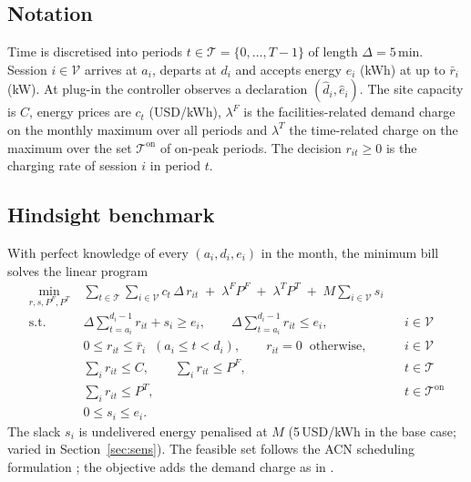 \subsection{Notation}
Time is discretised into periods $t\in\mathcal T=\{0,\dots,T-1\}$ of length $\Delta=5$\,min. Session $i\in\mathcal V$ arrives at $a_i$, departs at $d_i$ and accepts energy $e_i$ (kWh) at up to $\bar r_i$ (kW). At plug-in the controller observes a declaration $(\hat d_i,\hat e_i)$. The site capacity is $C$, energy prices are $c_t$ (USD/kWh), $\lambda^{F}$ is the facilities-related demand charge on the monthly maximum over all periods and $\lambda^{T}$ the time-related charge on the maximum over the set $\mathcal T^{\text{on}}$ of on-peak periods. The decision $r_{it}\ge0$ is the charging rate of session $i$ in period $t$.

\subsection{Hindsight benchmark}
With perfect knowledge of every $(a_i,d_i,e_i)$ in the month, the minimum bill solves the linear program
\begin{align}
\min_{r,s,P^F,P^T}\;& \sum_{t\in\mathcal T}\sum_{i\in\mathcal V} c_t\,\Delta\, r_{it} \;+\; \lambda^F P^F \;+\; \lambda^T P^T \;+\; M\sum_{i\in\mathcal V} s_i \label{eq:obj}\\
\text{s.t.}\;& \Delta\!\!\sum_{t=a_i}^{d_i-1}\! r_{it} + s_i \ge e_i,\qquad \Delta\!\!\sum_{t=a_i}^{d_i-1}\! r_{it}\le e_i, && i\in\mathcal V \label{eq:energy}\\
& 0\le r_{it}\le \bar r_i \;\;(a_i\le t<d_i),\qquad r_{it}=0\;\;\text{otherwise}, && i\in\mathcal V \label{eq:rate}\\
& \textstyle\sum_{i} r_{it}\le C, \qquad \sum_{i} r_{it}\le P^F, && t\in\mathcal T \label{eq:cap}\\
& \textstyle\sum_{i} r_{it}\le P^T, && t\in\mathcal T^{\text{on}} \label{eq:peakon}\\
& 0\le s_i\le e_i . \label{eq:slack}
\end{align}
The slack $s_i$ is undelivered energy penalised at $M$ (5\,USD/kWh in the base case; varied in Section~\ref{sec:sens}). The feasible set follows the ACN scheduling formulation \cite{Lee2019ACNData,Lee2021ACN}; the objective adds the demand charge as in \cite{Lee2020Pricing}.

